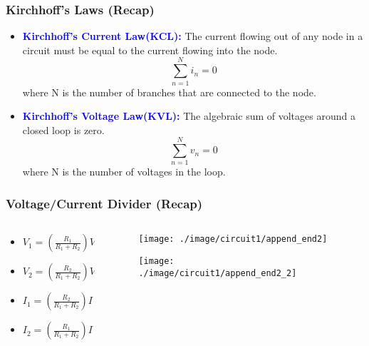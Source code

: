 \documentclass{beamer}
\newcommand{\blue}[1]{\textcolor{blue}{#1}}
\begin{document}
\begin{frame}
\frametitle{Kirchhoff’s Laws (Recap)}

\begin{itemize}
\item {\bf \blue{Kirchhoff’s Current Law(KCL):}}
The current flowing out of any node in a circuit must be equal to the current flowing into the node.
\begin{equation}
\sum_{n=1}^{N}i_n=0
\end{equation}
where N is the number of branches that are connected to the node.


\item {\bf \blue{Kirchhoff’s Voltage Law(KVL):}}
The algebraic sum of voltages around a closed loop is zero.
\begin{equation}
\sum_{n=1}^{N}v_n=0
\end{equation}
where N is the number of voltages in the loop.
\end{itemize}


\end{frame}

\begin{frame}

\frametitle{Voltage/Current Divider (Recap)}
\begin{columns}
\begin{column}{6cm}

\begin{itemize} \itemsep1pt \parskip0pt 
  \item[] $V_1 = (\frac{R_1}{R_1 + R_2})V$
  \item[] $V_2 = (\frac{R_2}{R_1 + R_2})V$
\end{itemize}
\vspace{12 mm}
\begin{itemize} \itemsep1pt \parskip0pt 
  \item[] $I_1 = (\frac{R_2}{R_1 + R_2})I$
  \item[] $I_2 = (\frac{R_1}{R_1 + R_2})I$
\end{itemize}
\end{column}

\begin{column}{6cm}
\begin{figure}[H]
  \centering
  \texttt{[image: ./image/circuit1/append\_end2]}
\end{figure}
\begin{figure}[H]
  \centering
  \texttt{[image: ./image/circuit1/append\_end2\_2]}
\end{figure}
\end{column}


\end{columns}

\end{frame}
\end{document}
